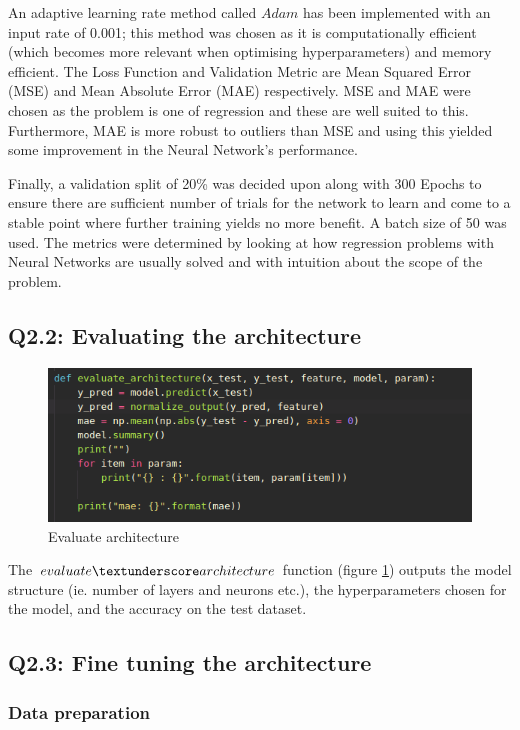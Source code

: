 \documentclass{article}
\begin{document}
An adaptive learning rate method called $Adam$ has been implemented with an input rate of 0.001; this method was chosen as it is computationally efficient (which becomes more relevant when optimising hyperparameters) and memory efficient. The Loss Function and Validation Metric are Mean Squared Error (MSE) and Mean Absolute Error (MAE) respectively. MSE and MAE were chosen as the problem is one of regression and these are well suited to this. Furthermore, MAE is more robust to outliers than MSE and using this yielded some improvement in the Neural Network's performance. 

Finally, a validation split of 20\% was decided upon along with 300 Epochs to ensure there are sufficient number of trials for the network to learn and come to a stable point where further training yields no more benefit. A batch size of 50 was used. The metrics were determined by looking at how regression problems with Neural Networks are usually solved and with intuition about the scope of the problem.

\newpage
\subsection{Q2.2: Evaluating the architecture}
\begin{figure}[h]
    \centering
    \includegraphics[scale=0.5]{figure/eval_arch.png}
    \caption{Evaluate architecture}
    \label{fig:eval_arch}
\end{figure}

The $evaluate \textunderscore architecture$ function (figure \ref{fig:eval_arch}) outputs the model structure (ie. number of layers and neurons etc.), the hyperparameters chosen for the model, and the accuracy on the test dataset.

\subsection{Q2.3: Fine tuning the architecture}
\subsubsection{Data preparation}
\end{document}
